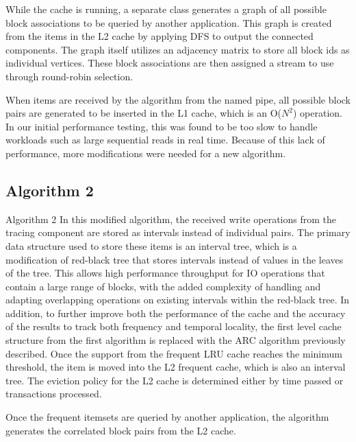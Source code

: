 \documentclass[MEng]{uofl}
\begin{document}
While the cache is running, a separate class generates a graph of all possible block associations to be queried by another application. This graph is created from the items in the L2 cache by applying DFS to output the connected components. The graph itself utilizes an adjacency matrix to store all block ids as individual vertices. These block associations are then assigned a stream to use through round-robin selection. 

When items are received by the algorithm from the named pipe, all possible block pairs are generated to be inserted in the L1 cache, which is an O($N^2$) operation. In our initial performance testing, this was found to be too slow to handle workloads such as large sequential reads in real time. Because of this lack of performance, more modifications were needed for a new algorithm.

\subsection{Algorithm 2}
Algorithm 2
In this modified algorithm, the received write operations from the tracing component are stored as intervals instead of individual pairs. The primary data structure used to store these items is an interval tree, which is a modification of red-black tree that stores intervals instead of values in the leaves of the tree. This allows high performance throughput for IO operations that contain a large range of blocks, with the added complexity of handling and adapting overlapping operations on existing intervals within the red-black tree. In addition, to further improve both the performance of the cache and the accuracy of the results to track both frequency and temporal locality, the first level cache structure from the first algorithm is replaced with the ARC algorithm previously described. Once the support from the frequent LRU cache reaches the minimum threshold, the item is moved into the L2 frequent cache, which is also an interval tree. The eviction policy for the L2 cache is determined either by time passed or transactions processed.

Once the frequent itemsets are queried by another application, the algorithm generates the correlated block pairs from the L2 cache. 
\end{document}
